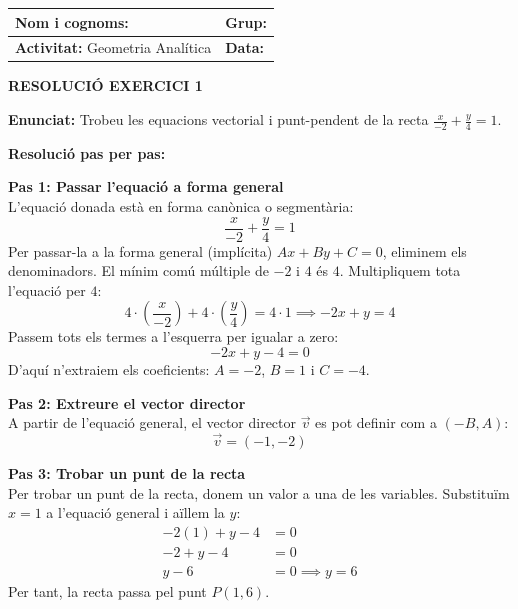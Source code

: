 \documentclass[12pt,a4paper]{article}
\begin{document}
\begingroup
\renewcommand{\arraystretch}{2.2}
\begin{tabularx}{\textwidth}{|X|p{4cm}|}
    \hline
    \textbf{Nom i cognoms:} & \textbf{Grup:} \\ \hline
    \textbf{Activitat:} Geometria Analítica & \textbf{Data:} \\ \hline
\end{tabularx}
\endgroup

\vspace{0.8cm}

\begin{center}
    {\Large \textbf{RESOLUCIÓ EXERCICI 1}}
\end{center}

\textbf{Enunciat:} Trobeu les equacions vectorial i punt-pendent de la recta $\frac{x}{-2} + \frac{y}{4} = 1$.

\vspace{0.5cm}
\textbf{Resolució pas per pas:}

\textbf{Pas 1: Passar l'equació a forma general} \\
L'equació donada està en forma canònica o segmentària:
\begin{equation*}
    \frac{x}{-2} + \frac{y}{4} = 1
\end{equation*}
Per passar-la a la forma general (implícita) $Ax + By + C = 0$, eliminem els denominadors. El mínim comú múltiple de $-2$ i $4$ és $4$. Multipliquem tota l'equació per $4$:
\begin{equation*}
    4 \cdot \left(\frac{x}{-2}\right) + 4 \cdot \left(\frac{y}{4}\right) = 4 \cdot 1 \implies -2x + y = 4
\end{equation*}
Passem tots els termes a l'esquerra per igualar a zero:
\begin{equation*}
    -2x + y - 4 = 0
\end{equation*}
D'aquí n'extraiem els coeficients: $A = -2$, $B = 1$ i $C = -4$.

\vspace{0.3cm}
\textbf{Pas 2: Extreure el vector director} \\
A partir de l'equació general, el vector director $\vec{v}$ es pot definir com a $(-B, A)$:
\begin{equation*}
    \vec{v} = (-1, -2)
\end{equation*}

\vspace{0.3cm}
\textbf{Pas 3: Trobar un punt de la recta} \\
Per trobar un punt de la recta, donem un valor a una de les variables. Substituïm $x = 1$ a l'equació general i aïllem la $y$:
\begin{align*}
    -2(1) + y - 4 &= 0 \\
    -2 + y - 4 &= 0 \\
    y - 6 &= 0 \implies y = 6
\end{align*}
Per tant, la recta passa pel punt $P(1, 6)$.
\end{document}
